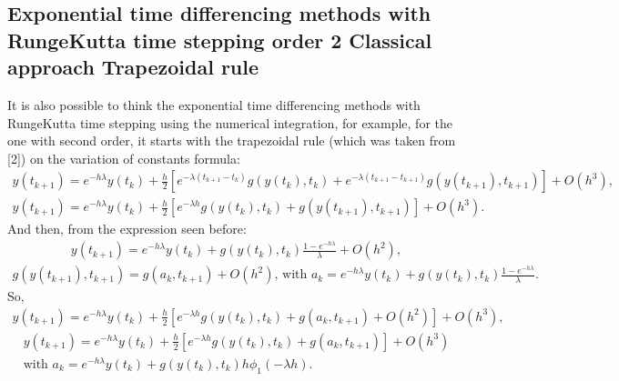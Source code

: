 \documentclass[letterpaper,10pt,english]{jupyterBook}
\begin{document}
\subsection{Exponential time differencing methods with Runge\sphinxhyphen{}Kutta time stepping \sphinxhyphen{} order 2 \sphinxhyphen{} Classical approach \sphinxhyphen{} Trapezoidal rule}
\label{\detokenize{appendix:exponential-time-differencing-methods-with-runge-kutta-time-stepping-order-2-classical-approach-trapezoidal-rule}}
\sphinxAtStartPar
It is also possible to think the exponential time differencing methods with Runge\sphinxhyphen{}Kutta time stepping using the numerical integration, for example, for the one with second order, it starts with the trapezoidal rule (which was taken from {[}2{]}) on the variation of constants formula:
\begin{equation*}
\begin{split}
y(t_{k+1}) = e^{-h \lambda}y(t_k) + \frac{h}{2} \left[ e^{-\lambda(t_{k+1}-t_k)} g(y(t_k), t_k) + e^{-\lambda(t_{k+1}-t_{k+1})} g(y(t_{k+1}), t_{k+1}) \right] + O(h^3), \\
    y(t_{k+1}) = e^{-h \lambda}y(t_k) + \frac{h}{2} \left[ e^{-\lambda h} g(y(t_k), t_k) + g(y(t_{k+1}), t_{k+1}) \right] +  O(h^3).
\end{split}
\end{equation*}
\sphinxAtStartPar
And then, from the expression seen before:
\begin{equation*}
\begin{split}
y(t_{k+1}) = e^{-h \lambda}y(t_k) + g(y(t_k), t_k) \frac{1-e^{-h \lambda}}{\lambda} + O(h^2),
\end{split}
\end{equation*}\begin{equation*}
\begin{split}
    g(y(t_{k+1}), t_{k+1}) = g(a_k, t_{k+1}) + O(h^2) \text{, with } a_k = e^{-h \lambda}y(t_k) + g(y(t_k), t_k) \frac{1-e^{-h\lambda}}{\lambda}.
\end{split}
\end{equation*}
\sphinxAtStartPar
So,
\begin{equation*}
\begin{split}
y(t_{k+1}) = e^{-h \lambda}y(t_k) + \frac{h}{2} \left[ e^{-\lambda h} g(y(t_k), t_k) + g(a_k, t_{k+1}) + O(h^2) \right] +  O(h^3),
\end{split}
\end{equation*}\begin{equation*}
\begin{split}
y(t_{k+1}) = e^{-h \lambda}y(t_k) + \frac{h}{2} \left[ e^{-\lambda h} g(y(t_k), t_k) + g(a_k, t_{k+1}) \right] +  O(h^3) \\
    \text{with } a_k = e^{-h \lambda}y(t_k) + g(y(t_k), t_k) h \phi_1 (-\lambda h).
\end{split}
\end{equation*}
\end{document}
